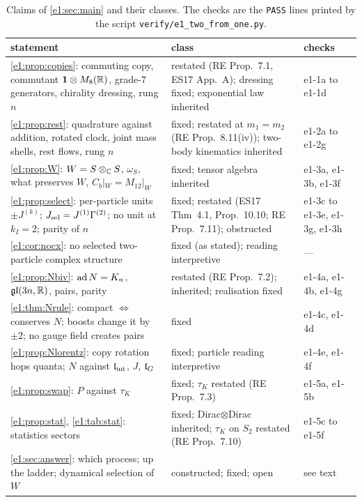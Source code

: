 \begin{table}[t]
\centering
\footnotesize
\begin{tabular}{@{}>{\raggedright\arraybackslash}p{8.3cm}>{\raggedright\arraybackslash}p{4.4cm}>{\raggedright\arraybackslash}p{2.2cm}@{}}
\toprule
statement & class & checks\\
\midrule
\cref{e1:prop:copies}: commuting copy, commutant $\mathbf 1\otimes M_8(\mathbb{R})$, grade-$7$ generators, chirality dressing, rung $n$ & restated (RE Prop.~7.1, ES17 App.~A); dressing fixed; exponential law inherited & e1-1a to e1-1d\\
\cref{e1:prop:rest}: quadrature against addition, rotated clock, joint mass shells, rest flows, rung $n$ & fixed; restated at $m_1=m_2$ (RE Prop.~8.11(iv)); two-body kinematics inherited & e1-2a to e1-2g\\
\cref{e1:prop:W}: $W=S\otimes_{\mathbb{C}} S$, $\omega_S$, what preserves $W$, $C_b|_W=M_{12}|_W$ & fixed; tensor algebra inherited & e1-3a, e1-3b, e1-3f\\
\cref{e1:prop:select}: per-particle units $\pm J^{(k)}$; $J_{\rm sel}=J^{(1)}\Gamma^{(2)}$; no unit at $k_I=2$; parity of $n$ & fixed; restated (ES17 Thm~4.1, Prop.~10.10; RE Prop.~7.11); obstructed & e1-3c to e1-3e, e1-3g, e1-3h\\
\cref{e1:cor:nocx}: no selected two-particle complex structure & fixed (as stated); reading interpretive & ---\\
\cref{e1:prop:Nbiv}: $\operatorname{ad} N=K_n$, $\mathfrak{gl}(3n,\mathbb{R})$, pairs, parity & restated (RE Prop.~7.2); inherited; realisation fixed & e1-4a, e1-4b, e1-4g\\
\cref{e1:thm:Nrule}: compact $\Leftrightarrow$ conserves $N$; boosts change it by $\pm2$; no gauge field creates pairs & fixed & e1-4c, e1-4d\\
\cref{e1:prop:Nlorentz}: copy rotation hops quanta; $N$ against $\mathfrak l_{\rm int}$, $J$, $\mathfrak l_G$ & fixed; particle reading interpretive & e1-4e, e1-4f\\
\cref{e1:prop:swap}: $P$ against $\tau_K$ & fixed; $\tau_K$ restated (RE Prop.~7.3) & e1-5a, e1-5b\\
\cref{e1:prop:stat}, \cref{e1:tab:stat}: statistics sectors & fixed; Dirac$\otimes$Dirac inherited; $\tau_K$ on $S_2$ restated (RE Prop.~7.10) & e1-5c to e1-5f\\
\cref{e1:sec:answer}: which process; up the ladder; dynamical selection of $W$ & constructed; fixed; open & see text\\
\bottomrule
\end{tabular}
\caption{Claims of \cref{e1:sec:main} and their classes. The checks are the \texttt{PASS} lines printed by the script
\texttt{verify/e1\_two\_from\_one.py}.}
\label{e1:tab:claims}
\end{table}
